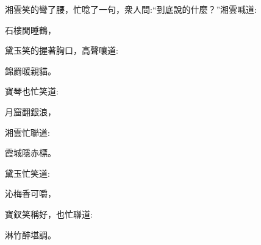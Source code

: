 \begin{parag}
    湘雲笑的彎了腰，忙唸了一句，衆人問:“到底說的什麼？”湘雲喊道:
\end{parag}


\begin{poem}
    \begin{pl} 石樓閒睡鶴，\end{pl}
\end{poem}


\begin{parag}
    黛玉笑的握著胸口，高聲嚷道:
\end{parag}


\begin{poem}
    \begin{pl} 錦罽暖親貓。\end{pl}
\end{poem}


\begin{parag}
    寶琴也忙笑道:
\end{parag}


\begin{poem}
    \begin{pl} 月窟翻銀浪，\end{pl}
\end{poem}


\begin{parag}
    湘雲忙聯道:
\end{parag}


\begin{poem}
    \begin{pl} 霞城隱赤標。\end{pl}
\end{poem}


\begin{parag}
    黛玉忙笑道:
\end{parag}


\begin{poem}
    \begin{pl} 沁梅香可嚼，\end{pl}
\end{poem}


\begin{parag}
    寶釵笑稱好，也忙聯道:
\end{parag}


\begin{poem}
    \begin{pl} 淋竹醉堪調。\end{pl}
\end{poem}


